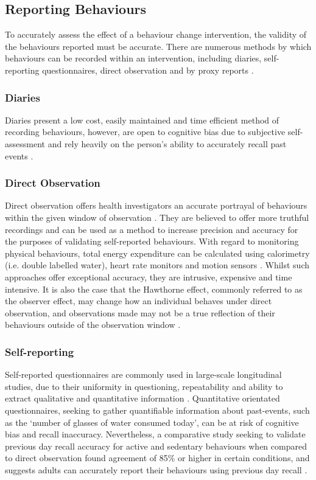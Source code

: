 \subsection{Reporting Behaviours} \label{subsection-reportingbehaviours}
To accurately assess the effect of a behaviour change intervention, the validity of the behaviours reported must be accurate. There are numerous methods by which behaviours can be recorded within an intervention, including diaries, self-reporting questionnaires, direct observation and by proxy reports \cite{Elliott2014}.

\subsubsection{Diaries}
Diaries present a low cost, easily maintained and time efficient method of recording behaviours, however, are open to cognitive bias due to subjective self-assessment and rely heavily on the person’s ability to accurately recall past events \cite{Stone2002}.

\subsubsection{Direct Observation}
Direct observation offers health investigators an accurate portrayal of behaviours within the given window of observation \cite{Prince2008}. They are believed to offer more truthful recordings and can be used as a method to increase precision and accuracy for the purposes of validating self-reported behaviours. With regard to monitoring physical behaviours, total energy expenditure can be calculated using calorimetry (i.e. double labelled water), heart rate monitors and motion sensors \cite{Prince2008}. Whilst such approaches offer exceptional accuracy, they are intrusive, expensive and time intensive. It is also the case that the Hawthorne effect, commonly referred to as the observer effect, may change how an individual behaves under direct observation, and observations made may not be a true reflection of their behaviours outside of the observation window \cite{McCarney2007}.

\subsubsection{Self-reporting}
Self-reported questionnaires are commonly used in large-scale longitudinal studies, due to their uniformity in questioning, repeatability and ability to extract qualitative and quantitative information \cite{DiMarco2014}. Quantitative orientated questionnaires, seeking to gather quantifiable information about past-events, such as the ‘number of glasses of water consumed today’, can be at risk of cognitive bias and recall inaccuracy. Nevertheless, a comparative study seeking to validate previous day recall accuracy for active and sedentary behaviours when compared to direct observation found agreement of 85\% or higher in certain conditions, and suggests adults can accurately report their behaviours using previous day recall \cite{KozeyKeadle2014}.

